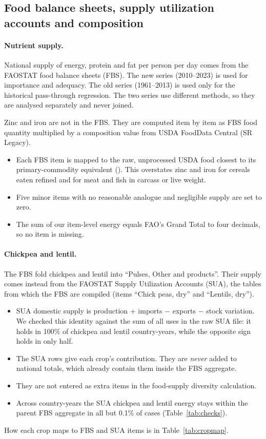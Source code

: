 \subsection{Food balance sheets, supply utilization accounts and composition}\label{sec:fbsmap}
\paragraph{Nutrient supply.} National supply of energy, protein and fat per person per day comes from the FAOSTAT
food balance sheets (FBS). The new series (2010--2023) is used for importance and adequacy. The old series
(1961--2013) is used only for the historical pass-through regression. The two series use different methods, so
they are analysed separately and never joined.

Zinc and iron are not in the FBS. They are computed item by item as FBS food quantity multiplied by a composition
value from USDA FoodData Central (SR Legacy).
\begin{itemize}
\item Each FBS item is mapped to the raw, unprocessed USDA food closest to its primary-commodity equivalent
(). This overstates zinc and iron for cereals eaten refined and for meat and fish in
carcass or live weight.
\item Five minor items with no reasonable analogue and negligible supply are set to zero.
\item The sum of our item-level energy equals FAO's Grand Total to four decimals, so no item is missing.
\end{itemize}

\paragraph{Chickpea and lentil.} The FBS fold chickpea and lentil into ``Pulses, Other and products''. Their
supply comes instead from the FAOSTAT Supply Utilization Accounts (SUA), the tables from which the FBS are
compiled (items ``Chick peas, dry'' and ``Lentils, dry'').
\begin{itemize}
\item SUA domestic supply is production $+$ imports $-$ exports $-$ stock variation. We checked this identity
against the sum of all uses in the raw SUA file: it holds in 100\% of chickpea and lentil country-years, while the
opposite sign holds in only half.
\item The SUA rows give each crop's contribution. They are \emph{never} added to national totals, which already
contain them inside the FBS aggregate.
\item They are not entered as extra items in the food-supply diversity calculation.
\item Across country-years the SUA chickpea and lentil energy stays within the parent FBS aggregate in all but
0.1\% of cases (Table~\ref{tab:checks}).
\end{itemize}
How each crop maps to FBS and SUA items is in Table~\ref{tab:cropmap}.

